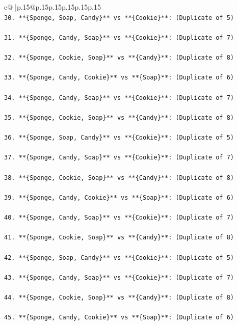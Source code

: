 \documentclass{article}
\begin{document}
{\begin{supertabular}{c@{$\;$}|p{.15\linewidth}@{}p{.15\linewidth}p{.15\linewidth}p{.15\linewidth}p{.15\linewidth}p{.15\linewidth}}
{{{\\ 
\texttt{30. **\{Sponge, Soap, Candy\}** vs **\{Cookie\}**: (Duplicate of 5)} \\
\\ 
\texttt{31. **\{Sponge, Candy, Soap\}** vs **\{Cookie\}**: (Duplicate of 7)} \\
\\ 
\texttt{32. **\{Sponge, Cookie, Soap\}** vs **\{Candy\}**: (Duplicate of 8)} \\
\\ 
\texttt{33. **\{Sponge, Candy, Cookie\}** vs **\{Soap\}**: (Duplicate of 6)} \\
\\ 
\texttt{34. **\{Sponge, Candy, Soap\}** vs **\{Cookie\}**: (Duplicate of 7)} \\
\\ 
\texttt{35. **\{Sponge, Cookie, Soap\}** vs **\{Candy\}**: (Duplicate of 8)} \\
\\ 
\texttt{36. **\{Sponge, Soap, Candy\}** vs **\{Cookie\}**: (Duplicate of 5)} \\
\\ 
\texttt{37. **\{Sponge, Candy, Soap\}** vs **\{Cookie\}**: (Duplicate of 7)} \\
\\ 
\texttt{38. **\{Sponge, Cookie, Soap\}** vs **\{Candy\}**: (Duplicate of 8)} \\
\\ 
\texttt{39. **\{Sponge, Candy, Cookie\}** vs **\{Soap\}**: (Duplicate of 6)} \\
\\ 
\texttt{40. **\{Sponge, Candy, Soap\}** vs **\{Cookie\}**: (Duplicate of 7)} \\
\\ 
\texttt{41. **\{Sponge, Cookie, Soap\}** vs **\{Candy\}**: (Duplicate of 8)} \\
\\ 
\texttt{42. **\{Sponge, Soap, Candy\}** vs **\{Cookie\}**: (Duplicate of 5)} \\
\\ 
\texttt{43. **\{Sponge, Candy, Soap\}** vs **\{Cookie\}**: (Duplicate of 7)} \\
\\ 
\texttt{44. **\{Sponge, Cookie, Soap\}** vs **\{Candy\}**: (Duplicate of 8)} \\
\\ 
\texttt{45. **\{Sponge, Candy, Cookie\}** vs **\{Soap\}**: (Duplicate of 6)} \\
}}}
\end{supertabular}}
\end{document}
